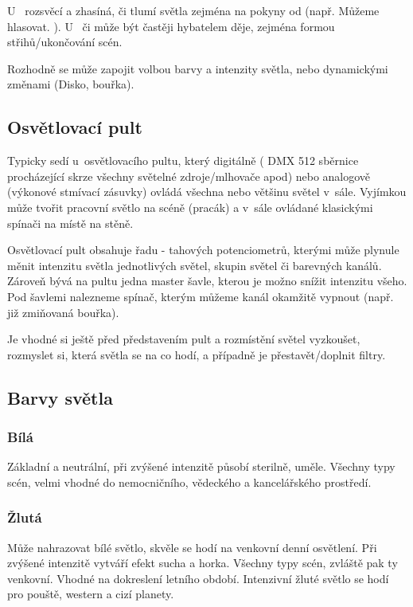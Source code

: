 
U~ rozsvěcí a zhasíná, či tlumí světla zejména na pokyny od  (např. Můžeme hlasovat. ).  
U~ či  může být častěji hybatelem děje, zejména formou střihů/ukončování scén. 
 
Rozhodně se může zapojit volbou barvy a intenzity světla, nebo dynamickými změnami  (Disko, bouřka). 
 
 
\subsection{Osvětlovací pult} Typicky sedí u~osvětlovacího pultu, který digitálně ( DMX 512 sběrnice procházející skrze všechny světelné zdroje/mlhovače apod) nebo analogově (výkonové stmívací zásuvky)  ovládá všechna nebo většinu světel v~sále. 
Vyjímkou může tvořit pracovní světlo na scéně (pracák) a v~sále ovládané klasickými spínači na místě na stěně. 
 
Osvětlovací pult obsahuje řadu   - tahových potenciometrů, kterými může plynule měnit intenzitu světla jednotlivých světel, skupin světel či barevných kanálů. 
Zároveň bývá na pultu jedna master šavle, kterou je možno snížit intenzitu všeho.  
Pod  šavlemi nalezneme spínač, kterým můžeme kanál okamžitě vypnout (např. již zmiňovaná bouřka). 
 
Je vhodné si ještě před představením pult a rozmístění světel vyzkoušet, rozmyslet si, která světla se na co hodí, a případně je přestavět/doplnit filtry. 
 
 
 
 
 
\subsection{ Barvy světla } \subsubsection{ 	Bílá } Základní a neutrální, při zvýšené intenzitě působí sterilně, uměle. 
Všechny typy scén, velmi vhodné do nemocničního, vědeckého a kancelářského prostředí. 
\subsubsection{ 	Žlutá } Může nahrazovat bílé světlo, skvěle se hodí na venkovní denní osvětlení. Při zvýšené intenzitě vytváří efekt sucha a horka. 
Všechny typy scén, zvláště pak ty venkovní. Vhodné na dokreslení letního období. Intenzivní žluté světlo se hodí pro pouště, western a cizí planety. 
